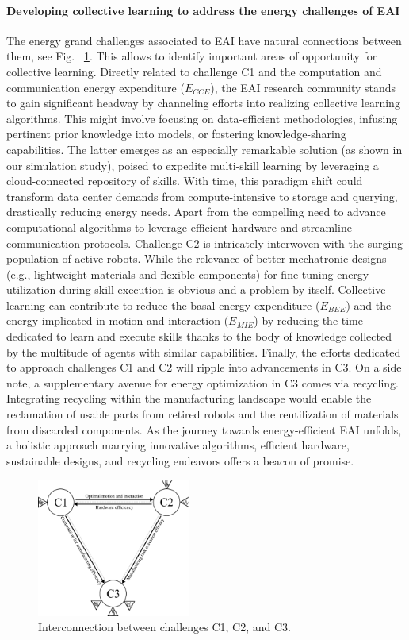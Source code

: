\documentclass[12pt]{article}
\begin{document}
\paragraph*{Developing collective learning to address the energy challenges of EAI}
The energy grand challenges associated to EAI have natural connections between them, see Fig.~	\ref{fig:challengesConnected}. This allows to identify important areas of opportunity for collective learning. Directly related to challenge C1 and the computation and communication energy expenditure ($E_{CCE}$), the EAI research community stands to gain significant headway by channeling efforts into realizing collective learning algorithms. This might involve focusing on data-efficient methodologies, infusing pertinent prior knowledge into models, or fostering knowledge-sharing capabilities. The latter emerges as an especially remarkable solution (as shown in our simulation study), poised to expedite multi-skill learning by leveraging a cloud-connected repository of skills. With time, this paradigm shift could transform data center demands from compute-intensive to storage and querying, drastically reducing energy needs. Apart from the compelling need to advance computational algorithms to leverage efficient hardware and streamline communication protocols. Challenge C2 is intricately interwoven with the surging population of active robots. While the relevance of better mechatronic designs (e.g., lightweight materials and flexible components) for fine-tuning energy utilization during skill execution is obvious and a problem by itself. Collective learning can contribute to reduce the basal energy expenditure ($E_{BEE}$) and the energy implicated in motion and interaction ($E_{MIE}$) by reducing the time dedicated to learn and execute skills thanks to the body of knowledge collected by the multitude of agents with similar capabilities. Finally, the efforts dedicated to approach challenges C1 and C2 will ripple into advancements in C3. On a side note, a supplementary avenue for energy optimization in C3 comes via recycling. Integrating recycling within the manufacturing landscape would enable the reclamation of usable parts from retired robots and the reutilization of materials from discarded components. As the journey towards energy-efficient EAI unfolds, a holistic approach marrying innovative algorithms, efficient hardware, sustainable designs, and recycling endeavors offers a beacon of promise.
\begin{figure}[!t]
	\centering
	\includegraphics[width=0.45\textwidth]{fig/grand_challenges_connections.png}
	\caption{Interconnection between challenges C1, C2, and C3.}
	\label{fig:challengesConnected}
\end{figure}
\end{document}
